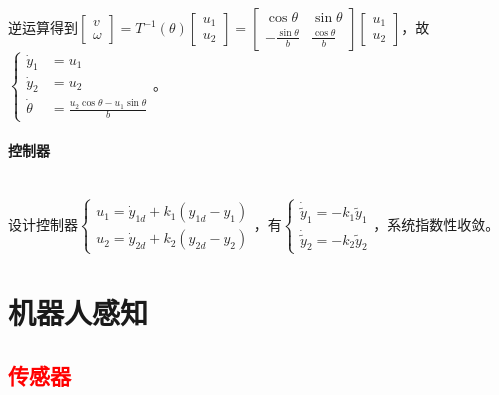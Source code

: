 \documentclass[
12pt, %
a4paper, 
oneside, %
]{scrartcl}
\begin{document}
逆运算得到$ \begin{bmatrix} v \\ \omega \end{bmatrix} = T^{-1}(\theta) \begin{bmatrix} u_1 \\ u_2 \end{bmatrix} = \begin{bmatrix} \cos\theta & \sin\theta \\ -\frac{\sin\theta}{b} & \frac{\cos\theta}{b} \end{bmatrix} \begin{bmatrix} u_1 \\ u_2 \end{bmatrix} $，故$ \begin{cases} \dot{y}_1 &= u_1 \\ \dot{y}_2 &= u_2 \\ \dot{\theta} &= \frac{u_2 \cos\theta - u_1 \sin\theta}{b} \end{cases} $。
\paragraph{控制器}~\\

设计控制器$ \begin{cases} u_1 = \dot{y}_{1d} + k_1(y_{1d} - y_1) \\ u_2 = \dot{y}_{2d} + k_2(y_{2d} - y_2) \end{cases} $，有$ \begin{cases} \dot{\tilde{y}}_1 = -k_1 \tilde{y}_1 \\ \dot{\tilde{y}}_2 = -k_2 \tilde{y}_2 \end{cases} $，系统指数性收敛。
\section{机器人感知}
\subsection[传感器]{\textcolor{red}{传感器}}
\end{document}

